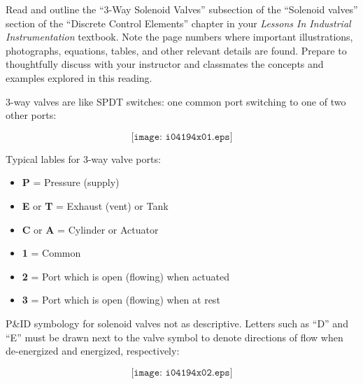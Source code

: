 

Read and outline the ``3-Way Solenoid Valves'' subsection of the ``Solenoid valves'' section of the ``Discrete Control Elements'' chapter in your {\it Lessons In Industrial Instrumentation} textbook.  Note the page numbers where important illustrations, photographs, equations, tables, and other relevant details are found.  Prepare to thoughtfully discuss with your instructor and classmates the concepts and examples explored in this reading.













3-way valves are like SPDT switches: one common port switching to one of two other ports:

$$\texttt{[image: i04194x01.eps]}$$

Typical lables for 3-way valve ports:

\begin{itemize}
\item{} {\bf P} = Pressure (supply)
\item{} {\bf E} or {\bf T} = Exhaust (vent) or Tank
\item{} {\bf C} or {\bf A} = Cylinder or Actuator
\end{itemize}

\begin{itemize}
\item{} {\bf 1} = Common
\item{} {\bf 2} = Port which is open (flowing) when actuated
\item{} {\bf 3} = Port which is open (flowing) when at rest
\end{itemize}

P\&ID symbology for solenoid valves not as descriptive.  Letters such as ``D'' and ``E'' must be drawn next to the valve symbol to denote directions of flow when de-energized and energized, respectively:

$$\texttt{[image: i04194x02.eps]}$$

\vskip 10pt


